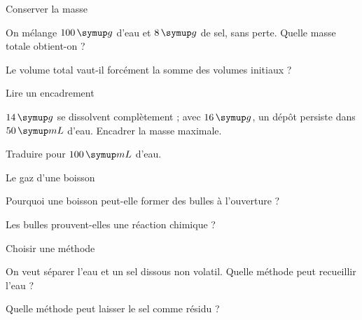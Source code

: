 \par\noindent\begin{minipage}{\linewidth}
\begin{exercice}[2]{Conserver la masse}
\begin{questions}
\item On mélange $100\unite g$ d’eau et $8\unite g$ de sel, sans perte. Quelle masse totale obtient-on ?
\item Le volume total vaut-il forcément la somme des volumes initiaux ?
\end{questions}
\end{exercice}
\end{minipage}
\par\noindent\begin{minipage}{\linewidth}
\begin{exercice}[2]{Lire un encadrement}
\begin{questions}
\item $14\unite g$ se dissolvent complètement ; avec $16\unite g$, un dépôt persiste dans $50\unite{mL}$ d’eau. Encadrer la masse maximale.
\item Traduire pour $100\unite{mL}$ d’eau.
\end{questions}
\end{exercice}
\end{minipage}
\par\noindent\begin{minipage}{\linewidth}
\begin{exercice}[2]{Le gaz d’une boisson}
\begin{questions}
\item Pourquoi une boisson peut-elle former des bulles à l’ouverture ?
\item Les bulles prouvent-elles une réaction chimique ?
\end{questions}
\end{exercice}
\end{minipage}
\par\noindent\begin{minipage}{\linewidth}
\begin{exercice}[2]{Choisir une méthode}
\begin{questions}
\item On veut séparer l’eau et un sel dissous non volatil. Quelle méthode peut recueillir l’eau ?
\item Quelle méthode peut laisser le sel comme résidu ?
\end{questions}
\end{exercice}
\end{minipage}
